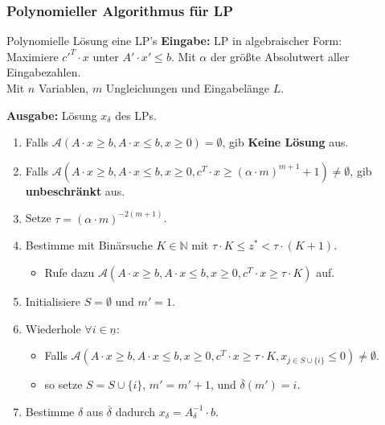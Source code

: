 \documentclass{panikzettel}
\begin{document}
\subsubsection{Polynomieller Algorithmus für LP}

\begin{algo}{Polynomielle Lösung eine LP's}
\textbf{Eingabe:} LP in algebraischer Form: \\
\-\hspace{1em} Maximiere ${c'}^T \cdot x$ unter $A' \cdot x' \leq b$.
Mit $\alpha$ der größte Absolutwert aller Eingabezahlen. \\
Mit $n$ Variablen, $m$ Ungleichungen und Eingabelänge $L$.

\textbf{Ausgabe:} Lösung $x_\delta$ des LPs.
\tcblower
\begin{enumerate}
    \item Falls $\mathcal{A}(A \cdot x \geq b,A \cdot x \leq b, x \geq 0) = \emptyset$, gib \textbf{Keine Lösung} aus.
    \item Falls $\mathcal{A}(A \cdot x \geq b,A \cdot x \leq b, x \geq 0, c^T \cdot x \geq (\alpha \cdot m)^{m+1} +1 ) \neq \emptyset$, gib \textbf{unbeschränkt} aus.
    \item Setze $\tau = (\alpha \cdot m)^{-2(m+1)}$.
    \item Bestimme mit Binärsuche $K \in \mathbb{N}$ mit $\tau \cdot K \leq z^* < \tau \cdot (K+1)$.
    \begin{itemize}
        \item Rufe dazu $\mathcal{A}(A \cdot x \geq b,A \cdot x \leq b, x \geq 0, c^T \cdot x \geq \tau \cdot K)$ auf.
    \end{itemize}
    \item Initialisiere $S = \emptyset$ und $m' = 1$.
    \item Wiederhole $\forall i \in \underline{n}$:
    \begin{itemize}
        \item Falls $\mathcal{A}(A \cdot x \geq b,A \cdot x \leq b, x \geq 0, c^T \cdot x \geq \tau \cdot K, x_{j \in S \cup \{ i \} } \leq 0) \neq \emptyset$.
        \item so setze $S = S \cup \{ i \}$, $m' = m' + 1$, und $\overline{\delta}(m') = i$.
    \end{itemize}
    \item Bestimme $\delta$ aus $\overline{\delta}$ dadurch $x_{\delta} = A_{\delta}^{-1} \cdot b$.
\end{enumerate}
\end{algo}
\end{document}
